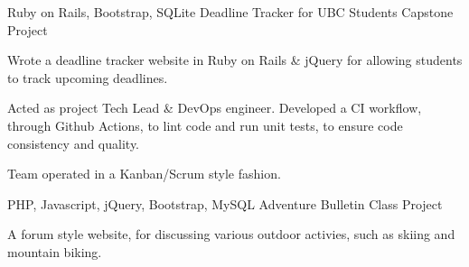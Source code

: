 

\begin{cventries}

  \cventry
    {Ruby on Rails, Bootstrap, SQLite}
    {Deadline Tracker for UBC Students} %
    {Capstone Project} %
    {} %
    {
      \begin{cvitems} %
        \item 
        {
            Wrote a deadline tracker website in Ruby on Rails \& jQuery for 
            allowing students to track upcoming deadlines.
        }
        \item 
        {
            Acted as project Tech Lead \& DevOps engineer.  Developed a CI 
            workflow, through Github Actions, to lint code and run unit tests, 
            to ensure code consistency and quality.
        }
        \item
        {
            Team operated in a Kanban/Scrum style fashion.
        }
      \end{cvitems}
    }

  \cventry
    {PHP, Javascript, jQuery, Bootstrap, MySQL} %
    {Adventure Bulletin} %
    {Class Project} %
    {} %
    {
      \begin{cvitems} %
        \item 
        {
            A forum style website, for discussing various outdoor activies, such
            as skiing and mountain biking.
        }
      \end{cvitems}
    }

\end{cventries}
